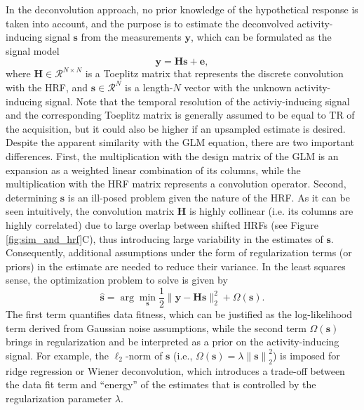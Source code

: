 In the deconvolution approach, no prior knowledge of the hypothetical response is taken into account, and the purpose is to estimate the deconvolved activity-inducing signal $\mathbf{s}$ from the measurements $\mathbf{y}$, which can be formulated as the signal model
\begin{equation}
    \label{eq:synthesis_model}
    \mathbf{y} = \mathbf{Hs} + \mathbf{e},
\end{equation}
where $\mathbf{H} \in \mathcal{R}^{N \times N}$ is a Toeplitz matrix that represents the discrete convolution with the HRF, and $\mathbf{s} \in \mathcal{R}^{N}$ is a length-$N$ vector with the unknown activity-inducing signal. Note that the temporal resolution of the activiy-inducing signal and the corresponding Toeplitz matrix is generally assumed to be equal to TR of the acquisition, but it could also be higher if an upsampled estimate is desired. Despite the apparent similarity with the GLM equation, there are two important differences. First, the multiplication with the design matrix of the GLM is an expansion as a weighted linear combination of its columns, while the multiplication with the HRF matrix represents a convolution operator. Second, determining $\mathbf{s}$ is an ill-posed problem given the nature of the HRF. As it can be seen intuitively, the convolution matrix $\mathbf{H}$ is highly collinear (i.e. its columns are highly correlated) due to large overlap between shifted HRFs (see Figure \ref{fig:sim_and_hrf}C), thus introducing large variability in the estimates of $\mathbf{s}$. Consequently, additional assumptions under the form of regularization terms (or priors) in the estimate are needed to reduce their variance. In the least squares sense, the optimization problem to solve is given by 
\begin{equation}
    \label{eq:regularized_least_squares}
    \hat{\mathbf{s}} = \arg \min_{\mathbf{s}} \frac{1}{2} \| \mathbf{y} - \mathbf{Hs} \|_2^2 + \Omega(\mathbf{s}).
\end{equation}
The first term quantifies data fitness, which can be justified as the log-likelihood term derived from Gaussian noise assumptions, while the second term \(\Omega(\mathbf{s})\) brings in regularization and be interpreted as a prior on the activity-inducing signal. For example, the $\ell_2$-norm of $\mathbf{s}$ (i.e., $\Omega(\mathbf{s})=\lambda \left\| \mathbf{s}\right\|_2^2$) is imposed for ridge regression or Wiener deconvolution, which introduces a trade-off between the data fit term and ``energy'' of the estimates that is controlled by the regularization parameter $\lambda$. %

